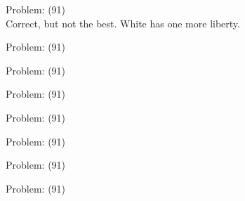 \documentclass[11pt]{article}
\begin{document}
\begin{minipage}[t]{0.5\textwidth}
  {\centering
  
  Problem: (91)\\
  Correct, but not the best. White has one more liberty.\\
  }
\end{minipage}
\begin{minipage}[t]{0.5\textwidth}
  {\centering
  
  Problem: (91)\\
  
  }
\end{minipage}
\begin{minipage}[t]{0.5\textwidth}
  {\centering
  
  Problem: (91)\\
  
  }
\end{minipage}
\begin{minipage}[t]{0.5\textwidth}
  {\centering
  
  Problem: (91)\\
  
  }
\end{minipage}
\begin{minipage}[t]{0.5\textwidth}
  {\centering
  
  Problem: (91)\\
  
  }
\end{minipage}
\begin{minipage}[t]{0.5\textwidth}
  {\centering
  
  Problem: (91)\\
  
  }
\end{minipage}
\begin{minipage}[t]{0.5\textwidth}
  {\centering
  
  Problem: (91)\\
  
  }
\end{minipage}
\begin{minipage}[t]{0.5\textwidth}
  {\centering
  
  Problem: (91)\\
  
  }
\end{minipage}
\end{document}
